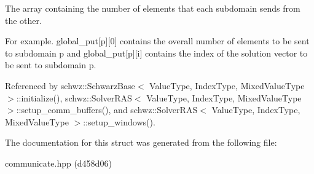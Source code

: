 The array containing the number of elements that each subdomain sends from the other. 

For example. global\+\_\+put\mbox{[}p\mbox{]}\mbox{[}0\mbox{]} contains the overall number of elements to be sent to subdomain p and global\+\_\+put\mbox{[}p\mbox{]}\mbox{[}i\mbox{]} contains the index of the solution vector to be sent to subdomain p. 

Referenced by schwz\+::\+Schwarz\+Base$<$ Value\+Type, Index\+Type, Mixed\+Value\+Type $>$\+::initialize(), schwz\+::\+Solver\+R\+A\+S$<$ Value\+Type, Index\+Type, Mixed\+Value\+Type $>$\+::setup\+\_\+comm\+\_\+buffers(), and schwz\+::\+Solver\+R\+A\+S$<$ Value\+Type, Index\+Type, Mixed\+Value\+Type $>$\+::setup\+\_\+windows().



The documentation for this struct was generated from the following file\+:\begin{DoxyCompactItemize}
\item 
communicate.\+hpp (d458d06)\end{DoxyCompactItemize}
